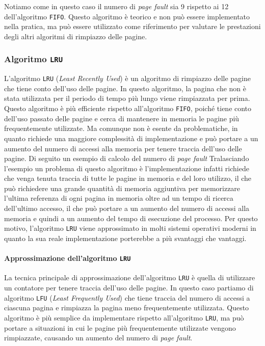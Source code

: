             Notiamo come in questo caso il numero di \textit{page fault} sia 9 rispetto ai 12 dell'algoritmo \texttt{FIFO}. Questo algoritmo è teorico e non può essere implementato nella pratica, ma può essere utilizzato come riferimento per valutare le prestazioni degli altri algoritmi di rimpiazzo delle pagine.
        \subsubsection{Algoritmo \texttt{LRU}}
            L'algoritmo \texttt{LRU} (\textit{Least Recently Used}) è un algoritmo di rimpiazzo delle pagine che tiene conto dell'uso delle pagine. In questo algoritmo, la pagina che non è stata utilizzata per il periodo di tempo più lungo viene rimpiazzata per prima. Questo algoritmo è più efficiente rispetto all'algoritmo \texttt{FIFO}, poiché tiene conto dell'uso passato delle pagine e cerca di mantenere in memoria le pagine più frequentemente utilizzate. Ma comunque non è esente da problematiche, in quanto richiede una maggiore complessità di implementazione e può portare a un aumento del numero di accessi alla memoria per tenere traccia dell'uso delle pagine. Di seguito un esempio di calcolo del numero di \textit{page fault}\newline
            Tralasciando l'esempio un problema di questo algoritmo è l'implementazione infatti richiede che venga tenuta traccia di tutte le pagine in memoria e del loro utilizzo, il che può richiedere una grande quantità di memoria aggiuntiva per memorizzare l'ultima referenza di ogni pagina in memoria oltre ad un tempo di ricerca dell'ultimo accesso, il che può portare a un aumento del numero di accessi alla memoria e quindi a un aumento del tempo di esecuzione del processo. Per questo motivo, l'algoritmo \texttt{LRU} viene approssimato in molti sistemi operativi moderni in quanto la sua reale implementazione porterebbe a più svantaggi che vantaggi.
            \paragraph{Approssimazione dell'algoritmo \texttt{LRU}}
                La tecnica principale di approssimazione dell'algoritmo \texttt{LRU} è quella di utilizzare un contatore per tenere traccia dell'uso delle pagine. In questo caso partiamo di algoritmo \texttt{LFU} (\textit{Least Frequently Used}) che tiene traccia del numero di accessi a ciascuna pagina e rimpiazza la pagina meno frequentemente utilizzata. Questo algoritmo è più semplice da implementare rispetto all'algoritmo \texttt{LRU}, ma può portare a situazioni in cui le pagine più frequentemente utilizzate vengono rimpiazzate, causando un aumento del numero di \textit{page fault}. 
